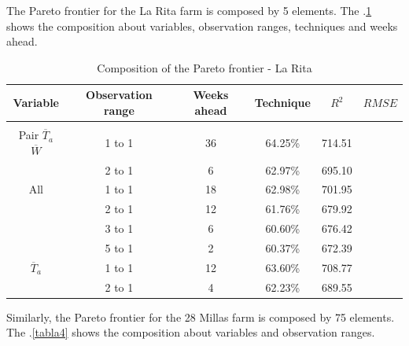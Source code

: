 The Pareto frontier for the La Rita farm is composed by 5 elements. The \tablename $.$\ref{tabla3} shows the composition about variables, observation ranges, techniques and weeks ahead.

\begin{table}[h] 
\caption{Composition of the Pareto frontier - La Rita} 
\label{tabla3} 
\centering
\begin{tabular}{c|c|c|c|c|c} 
\hline
\bfseries Variable & \bfseries Observation range & \bfseries Weeks ahead & \bfseries Technique &\bfseries $R^2$ & \bfseries $RMSE$\\ 
\hline\hline 
  &   &  &  &   &  \\



Pair $\overline{T}_{a}$ $\overline{W}$ &	1 to 1  & 36 & 64.25\% & 714.51 \\
 &	2 to 1  & 6 & 62.97\% & 695.10 \\
\hline 
All  & 1 to 1  & 18 & 62.98\% & 701.95 \\
   & 2 to 1  & 12 & 61.76\% & 679.92 \\
    & 3 to 1  & 6 & 60.60\% & 676.42 \\
    & 5 to 1  &  2 & 60.37\% & 672.39 \\
\hline    
$\overline{T}_{a}$ & 1 to 1  & 12  & 63.60\% & 708.77 \\
       &	2 to 1  & 4 & 62.23\% & 689.55 \\
\hline
\end{tabular} 
\end{table}

Similarly, the Pareto frontier for the 28 Millas farm is composed by 75 elements. The \tablename $.$\ref{tabla4} shows the composition about variables and observation ranges.

